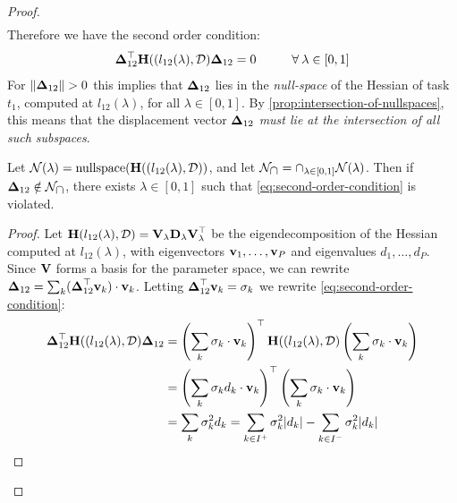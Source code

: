 \documentclass{article} %
\newcommand{\hessian}{\vH}
\begin{document}
\begin{proof}
\begin{align}
\end{align}
Therefore we have the second order condition: 
\begin{equation}  
\label{eq:second-order-condition}
\vDelta_{12}^\top\hessian((l_{12}(\lambda), \data)\vDelta_{12} = 0 \hspace{1cm}\forall \:\lambda \in [0,1]
\end{equation}
For $\|\mbox{$\mbox{$\boldsymbol{\Delta}$}$}_{12}\| > 0$ this implies that $\mbox{$\mbox{$\boldsymbol{\Delta}$}$}_{12}$ lies in the \emph{null-space} of the Hessian of task $t_1$, computed at $l_{12}(\lambda)$, for all $\lambda \in [0,1]$. By \cref{prop:intersection-of-nullspaces}, this means that the displacement vector $\mbox{$\mbox{$\boldsymbol{\Delta}$}$}_{12}$ \emph{must lie at the intersection of all such subspaces}. 

\begin{prop}
\label{prop:intersection-of-nullspaces}
Let $\mathcal{N}(\lambda) = \nullspace(\hessian((l_{12}(\lambda), \data))$, and let $\mathcal{N}_{\mbox{$\cap$}} = \mbox{$\cap$}_{\lambda \in [0,1]} \mathcal{N}(\lambda)$. Then if $\mbox{$\mbox{$\boldsymbol{\Delta}$}$}_{12} \notin \mathcal{N}_{\mbox{$\cap$}}$, there exists $\lambda \in [0,1]$ such that \cref{eq:second-order-condition} is violated.
\end{prop}
\begin{proof}
    Let $\hessian(l_{12}(\lambda), \data) = \vV_{\lambda}\vD_{\lambda} \vV_{\lambda}^\top$ be the eigendecomposition of the Hessian computed at $l_{12}(\lambda)$, with eigenvectors $\mbox{$\mbox{$\mathbf{v}$}$}_1, \dots, \mbox{$\mbox{$\mathbf{v}$}$}_P$ and eigenvalues $d_1, \dots, d_P$. Since $\mbox{$\mbox{$\mathbf{V}$}$}$ forms a basis for the parameter space, we can rewrite $\mbox{$\mbox{$\boldsymbol{\Delta}$}$}_{12} = \sum_k  (\mbox{$\mbox{$\boldsymbol{\Delta}$}$}_{12}^\top \mbox{$\mbox{$\mathbf{v}$}$}_k) \cdot \mbox{$\mbox{$\mathbf{v}$}$}_k$. Letting $\mbox{$\mbox{$\boldsymbol{\Delta}$}$}_{12}^\top \mbox{$\mbox{$\mathbf{v}$}$}_k = \sigma_k$ we rewrite \cref{eq:second-order-condition}: 
    \begin{align}
        \vDelta_{12}^\top\hessian((l_{12}(\lambda), \data)\vDelta_{12} 
        & = \rnd{\sum_{k} \sigma_k \cdot \vv_k}^\top \hessian((l_{12}(\lambda), \data)\rnd{\sum_{k} \sigma_k \cdot \vv_k}\\
        & = \rnd{\sum_k \sigma_k d_k \cdot \vv_k}^\top \rnd{\sum_{k} \sigma_k\cdot \vv_k}\\
        & = \sum_k \sigma_k^2 d_k = \sum_{k\in I^+}\sigma_k^2 |d_k| - \sum_{k\in I^-}\sigma_k^2 |d_k|  
    \end{align}
    

\end{proof}
\end{proof}
\end{document}
